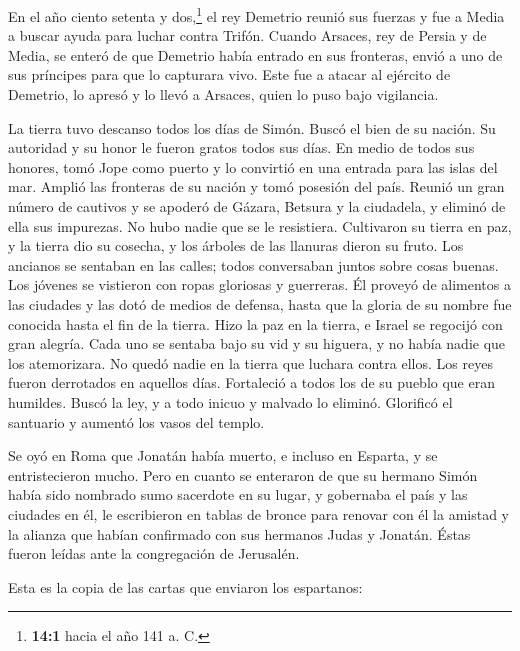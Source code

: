  En el año ciento setenta y dos,\footnote{\textbf{14:1}
  hacia el año 141 a. C.} el rey Demetrio reunió sus fuerzas y fue a
Media a buscar ayuda para luchar contra Trifón.  Cuando
Arsaces, rey de Persia y de Media, se enteró de que Demetrio había
entrado en sus fronteras, envió a uno de sus príncipes para que lo
capturara vivo.  Este fue a atacar al ejército de
Demetrio, lo apresó y lo llevó a Arsaces, quien lo puso bajo vigilancia.

 La tierra tuvo descanso todos los días de Simón. Buscó el
bien de su nación. Su autoridad y su honor le fueron gratos todos sus
días.  En medio de todos sus honores, tomó Jope como
puerto y lo convirtió en una entrada para las islas del mar.
 Amplió las fronteras de su nación y tomó posesión del
país.  Reunió un gran número de cautivos y se apoderó de
Gázara, Betsura y la ciudadela, y eliminó de ella sus impurezas. No hubo
nadie que se le resistiera.  Cultivaron su tierra en paz,
y la tierra dio su cosecha, y los árboles de las llanuras dieron su
fruto.  Los ancianos se sentaban en las calles; todos
conversaban juntos sobre cosas buenas. Los jóvenes se vistieron con
ropas gloriosas y guerreras.  Él proveyó de alimentos a
las ciudades y las dotó de medios de defensa, hasta que la gloria de su
nombre fue conocida hasta el fin de la tierra.  Hizo la
paz en la tierra, e Israel se regocijó con gran alegría. 
Cada uno se sentaba bajo su vid y su higuera, y no había nadie que los
atemorizara.  No quedó nadie en la tierra que luchara
contra ellos. Los reyes fueron derrotados en aquellos días.
 Fortaleció a todos los de su pueblo que eran humildes.
Buscó la ley, y a todo inicuo y malvado lo eliminó. 
Glorificó el santuario y aumentó los vasos del templo.

 Se oyó en Roma que Jonatán había muerto, e incluso en
Esparta, y se entristecieron mucho.  Pero en cuanto se
enteraron de que su hermano Simón había sido nombrado sumo sacerdote en
su lugar, y gobernaba el país y las ciudades en él,  le
escribieron en tablas de bronce para renovar con él la amistad y la
alianza que habían confirmado con sus hermanos Judas y Jonatán.
 Éstas fueron leídas ante la congregación de Jerusalén.

 Esta es la copia de las cartas que enviaron los
espartanos:

